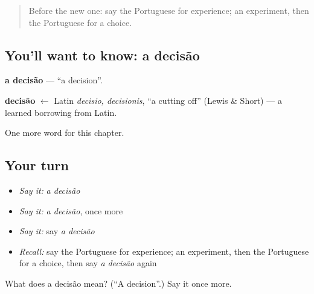 \label{lesson:PT-C247-decisao}



\begin{quote}
Before the new one: say the Portuguese for experience; an experiment, then the Portuguese for a choice.
\end{quote}

\subsection*{You'll want to know: a decisão}
\textbf{a decisão} — \textquotedblleft{}a decision\textquotedblright{}.

\begin{cousinweb}
\textbf{decisão} $\leftarrow$ Latin \emph{decisio, decisionis}, \textquotedblleft{}a cutting off\textquotedblright{} (Lewis \& Short) — a learned borrowing from Latin.
\end{cousinweb}

\begin{grammarlens}[title={What you've built}]
One more word for this chapter.
\end{grammarlens}

\subsection*{Your turn}
\begin{itemize}
\raggedright
  \item \emph{Say it:} \emph{a decisão}
  \item \emph{Say it:} \emph{a decisão}, once more
  \item \emph{Say it:} say \emph{a decisão}
  \item \emph{Recall:} say the Portuguese for experience; an experiment, then the Portuguese for a choice, then say \emph{a decisão} again
\end{itemize}

\begin{tcolorbox}[breakable,colback=teal!4,colframe=teal!35!black,title={Before you move on}]
What does a decisão mean? (\textquotedblleft{}A decision\textquotedblright{}.) Say it once more.
\end{tcolorbox}
